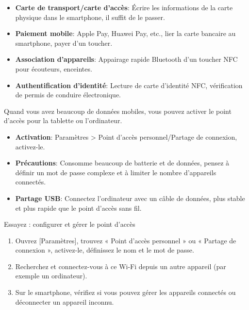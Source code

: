 \begin{itemize}
  \item \textbf{Carte de transport/carte d'accès}: Écrire les informations de la carte physique dans le smartphone, il suffit de le passer.
  \item \textbf{Paiement mobile}: Apple Pay, Huawei Pay, etc., lier la carte bancaire au smartphone, payer d'un toucher.
  \item \textbf{Association d'appareils}: Appairage rapide Bluetooth d'un toucher NFC pour écouteurs, enceintes.
  \item \textbf{Authentification d'identité}: Lecture de carte d'identité NFC, vérification de permis de conduire électronique.
\end{itemize}


Quand vous avez beaucoup de données mobiles, vous pouvez activer le point d'accès pour la tablette ou l'ordinateur.

\begin{itemize}
  \item \textbf{Activation}: Paramètres > Point d'accès personnel/Partage de connexion, activez-le.
  \item \textbf{Précautions}: Consomme beaucoup de batterie et de données, pensez à définir un mot de passe complexe et à limiter le nombre d'appareils connectés.
  \item \textbf{Partage USB}: Connectez l'ordinateur avec un câble de données, plus stable et plus rapide que le point d'accès sans fil.
\end{itemize}

\begin{tcbpractice}{Essayez : configurer et gérer le point d'accès}
\begin{enumerate}
  \item Ouvrez [Paramètres], trouvez « Point d'accès personnel » ou « Partage de connexion », activez-le, définissez le nom et le mot de passe.
  \item Recherchez et connectez-vous à ce Wi-Fi depuis un autre appareil (par exemple un ordinateur).
  \item Sur le smartphone, vérifiez si vous pouvez gérer les appareils connectés ou déconnecter un appareil inconnu.
\end{enumerate}

\end{tcbpractice}
